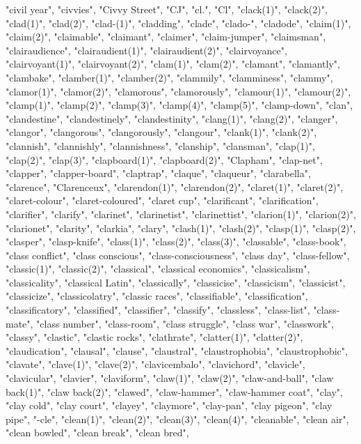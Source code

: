 "civil year",
"civvies",
"Civvy Street",
"CJ",
"cl.",
"Cl",
"clack(1)",
"clack(2)",
"clad(1)",
"clad(2)",
"clad-(1)",
"cladding",
"clade",
"clado-",
"cladode",
"claim(1)",
"claim(2)",
"claimable",
"claimant",
"claimer",
"claim-jumper",
"claimsman",
"clairaudience",
"clairaudient(1)",
"clairaudient(2)",
"clairvoyance",
"clairvoyant(1)",
"clairvoyant(2)",
"clam(1)",
"clam(2)",
"clamant",
"clamantly",
"clambake",
"clamber(1)",
"clamber(2)",
"clammily",
"clamminess",
"clammy",
"clamor(1)",
"clamor(2)",
"clamorous",
"clamorously",
"clamour(1)",
"clamour(2)",
"clamp(1)",
"clamp(2)",
"clamp(3)",
"clamp(4)",
"clamp(5)",
"clamp-down",
"clan",
"clandestine",
"clandestinely",
"clandestinity",
"clang(1)",
"clang(2)",
"clanger",
"clangor",
"clangorous",
"clangorously",
"clangour",
"clank(1)",
"clank(2)",
"clannish",
"clannishly",
"clannishness",
"clanship",
"clansman",
"clap(1)",
"clap(2)",
"clap(3)",
"clapboard(1)",
"clapboard(2)",
"Clapham",
"clap-net",
"clapper",
"clapper-board",
"claptrap",
"claque",
"claqueur",
"clarabella",
"clarence",
"Clarenceux",
"clarendon(1)",
"clarendon(2)",
"claret(1)",
"claret(2)",
"claret-colour",
"claret-coloured",
"claret cup",
"clarificant",
"clarification",
"clarifier",
"clarify",
"clarinet",
"clarinetist",
"clarinettist",
"clarion(1)",
"clarion(2)",
"clarionet",
"clarity",
"clarkia",
"clary",
"clash(1)",
"clash(2)",
"clasp(1)",
"clasp(2)",
"clasper",
"clasp-knife",
"class(1)",
"class(2)",
"class(3)",
"classable",
"class-book",
"class conflict",
"class conscious",
"class-consciousness",
"class day",
"class-fellow",
"classic(1)",
"classic(2)",
"classical",
"classical economics",
"classicalism",
"classicality",
"classical Latin",
"classically",
"classicise",
"classicism",
"classicist",
"classicize",
"classicolatry",
"classic races",
"classifiable",
"classification",
"classificatory",
"classified",
"classifier",
"classify",
"classless",
"class-list",
"class-mate",
"class number",
"class-room",
"class struggle",
"class war",
"classwork",
"classy",
"clastic",
"clastic rocks",
"clathrate",
"clatter(1)",
"clatter(2)",
"claudication",
"clausal",
"clause",
"claustral",
"claustrophobia",
"claustrophobic",
"clavate",
"clave(1)",
"clave(2)",
"clavicembalo",
"clavichord",
"clavicle",
"clavicular",
"clavier",
"claviform",
"claw(1)",
"claw(2)",
"claw-and-ball",
"claw back(1)",
"claw back(2)",
"clawed",
"claw-hammer",
"claw-hammer coat",
"clay",
"clay cold",
"clay court",
"clayey",
"claymore",
"clay-pan",
"clay pigeon",
"clay pipe",
"-cle",
"clean(1)",
"clean(2)",
"clean(3)",
"clean(4)",
"cleanable",
"clean air",
"clean bowled",
"clean break",
"clean bred",
